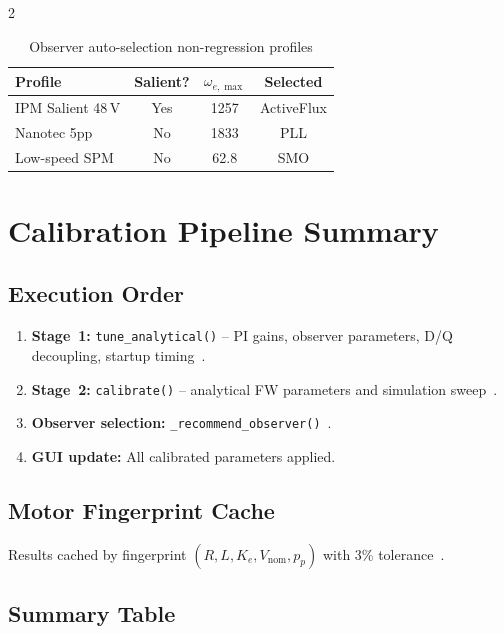 \documentclass[10pt,twoside,a4paper]{article}
\begin{document}
\begin{multicols}{2}
\begin{table}[htbp]
  \centering\small
  \caption{Observer auto-selection non-regression profiles}
  \begin{tabular}{@{}lccc@{}}
    \toprule
    Profile & Salient? & $\omega_{e,\max}$ & Selected\\
    \midrule
    IPM Salient 48\,V & Yes & 1257 & ActiveFlux\\
    Nanotec 5pp       & No  & 1833 & PLL\\
    Low-speed SPM     & No  & 62.8 & SMO\\
    \bottomrule
  \end{tabular}
\end{table}

\newpage
\section{Calibration Pipeline Summary}\label{sec:summary}

\subsection{Execution Order}

\begin{enumerate}
  \item \textbf{Stage~1:} \texttt{tune\_analytical()} -- PI gains, observer
    parameters, D/Q decoupling, startup timing~\cite{astrom2006,briz2000}.
  \item \textbf{Stage~2:} \texttt{calibrate()} -- analytical FW parameters and
    simulation sweep~\cite{zhu2007,rahman1998}.
  \item \textbf{Observer selection:} \texttt{\_recommend\_observer()}~\cite{schroedl1996,boldea2008}.
  \item \textbf{GUI update:} All calibrated parameters applied.
\end{enumerate}

\subsection{Motor Fingerprint Cache}

Results cached by fingerprint $(R,L,K_e,V_\text{nom},p_p)$ with 3\% tolerance~\cite{zhu2007}.

\subsection{Summary Table}


\end{multicols}
\end{document}
